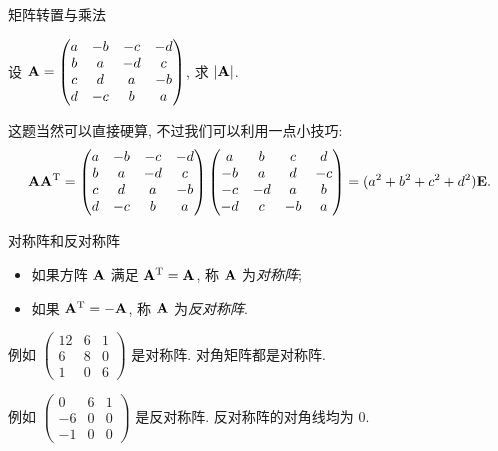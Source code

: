 \begin{frame}{矩阵转置与乘法}
	\onslide<+->
	\begin{example}
		设 ${\mathbf{A}}=\begin{pmatrix}
			a&-b&-c&-d\\
			b&a&-d&c\\
			c&d&a&-b\\
			d&-c&b&a
		\end{pmatrix}$, 求 $|{\mathbf{A}}|$.
	\end{example}
	\onslide<+->
	这题当然可以直接硬算, 不过我们可以利用一点小技巧:
	\[{\mathbf{A}}{\mathbf{A}}^{\mathrm{T}}=\begin{pmatrix}
		a&-b&-c&-d\\
		b&a&-d&c\\
		c&d&a&-b\\
		d&-c&b&a
	\end{pmatrix}\begin{pmatrix}
		a&b&c&d\\
		-b&a&d&-c\\
		-c&-d&a&b\\
		-d&c&-b&a
	\end{pmatrix}=(a^2+b^2+c^2+d^2){\mathbf{E}}.\]
\end{frame}


\begin{frame}{对称阵和反对称阵}
	\onslide<+->
	\begin{definition}
		\begin{itemize}
			\item 如果方阵 ${\mathbf{A}}$ 满足 ${\mathbf{A}}^{\mathrm{T}}={\mathbf{A}}$, 称 ${\mathbf{A}}$ 为\emph{对称阵};
			\item 如果 ${\mathbf{A}}^{\mathrm{T}}=-{\mathbf{A}}$, 称 ${\mathbf{A}}$ 为\emph{反对称阵}.
		\end{itemize}
	\end{definition}
	\onslide<+->
	例如 $\begin{pmatrix}
		12&6&1\\
		6&8&0\\
		1&0&6
	\end{pmatrix}$
	是对称阵.
	\onslide<+->
	对角矩阵都是对称阵.
	
	\onslide<+->
	例如 $\begin{pmatrix}
		0&6&1\\
		-6&0&0\\
		-1&0&0
	\end{pmatrix}$
	是反对称阵.
	\onslide<+->
	反对称阵的对角线均为 $0$.
\end{frame}


